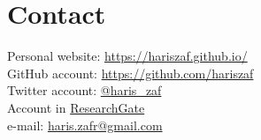 \section*{Contact}

Personal website: \href{https://hariszaf.github.io/}{https://hariszaf.github.io/} \\
GitHub account: \href{https://github.com/hariszaf}{https://github.com/hariszaf}  \\
Twitter account: \href{https://twitter.com/haris_zaf}{@haris\_zaf} \\
Account in \href{https://www.researchgate.net/profile/Haris-Zafeiropoulos}{ResearchGate} \\
e-mail: \href{mailto:haris.zafr@gmail.com}{haris.zafr@gmail.com}

